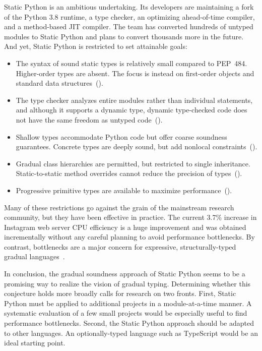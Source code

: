 \documentclass[english,cleveref,crc]{programming}
\newcommand{\SP}{Static Python}
\newcommand{\PEP}{PEP~484}
\newcommand{\CPUchange}{3.7\%}
\begin{document}
\SP{} is an ambitious undertaking.
Its developers are maintaining a fork of the Python 3.8 runtime,
a type checker,
an optimizing ahead-of-time compiler,
and a method-based JIT compiler.
The team has converted hundreds of untyped modules to \SP{}
and plans to convert thousands more in the future.
And yet, \SP{} is restricted to set attainable goals:
\begin{itemize}
  \item
    The syntax of sound static types is relatively small compared
    to \PEP{}.
    Higher-order types are absent.
    The focus is instead on first-order objects and standard data structures~().
  \item
    The type checker analyzes entire modules rather than individual statements,
    and although it supports a dynamic type, dynamic type-checked code
    does not have the same freedom as untyped code~().
  \item
    Shallow types accommodate Python code but offer coarse
    soundness guarantees.
    Concrete types are deeply sound, but add nonlocal constraints~().
  \item
    Gradual class hierarchies are permitted, but restricted to single inheritance.
    Static-to-static method overrides cannot reduce the precision of types~().
  \item
    Progressive primitive types are available to maximize performance~().
\end{itemize}
%
Many of these restrictions go against the grain of the mainstream
research community, but they have been effective in practice.
The current \CPUchange{} increase in Instagram web server CPU efficiency is a huge improvement
and was obtained incrementally without any careful planning to avoid performance bottlenecks.
By contrast, bottlenecks are a major concern for expressive, structurally-typed
gradual languages~\cite{gtnffvf-jfp-2019,tfgnvf-popl-2016}.

In conclusion, the gradual soundness approach of \SP{} seems to be a promising
way to realize the vision of gradual typing.
Determining whether this conjecture holds more broadly
calls for research on two fronts.
First, \SP{} must be applied to additional projects in a module-at-a-time manner.
A systematic evaluation of a few small projects would be
especially useful to find performance bottlenecks.
Second, the \SP{} approach should be adapted to other languages.
An optionally-typed language such as TypeScript would be an ideal starting
point.
\end{document}
